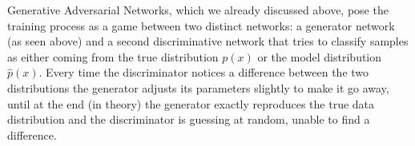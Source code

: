 Generative Adversarial Networks, which we already discussed above, pose the training process as a game between two distinct networks: a generator network (as seen above) and a second discriminative network that tries to classify samples as either coming from the true distribution $p(x)$ or the model distribution $\hat{p}(x)$. Every time the discriminator notices a difference between the two distributions the generator adjusts its parameters slightly to make it go away, until at the end (in theory) the generator exactly reproduces the true data distribution and the discriminator is guessing at random, unable to find a difference.
